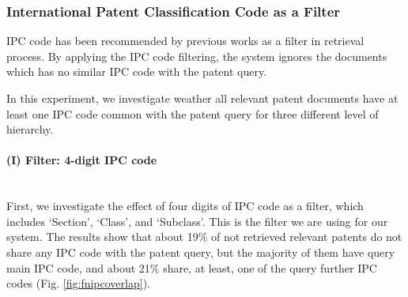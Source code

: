 \subsubsection{International Patent Classification Code as a Filter}
IPC code has been recommended by previous works as a filter in retrieval process. By applying the IPC code filtering, the system ignores the documents which has no similar IPC code with the patent query. 

In this experiment, we investigate weather all relevant patent documents have at least one IPC code common with the patent query for three different level of hierarchy. 
\paragraph{(I) Filter: 4-digit IPC code}
\ \\
First, we investigate the effect of four digits of IPC code as a filter, which includes `Section', `Class', and `Subclass'. 
This is the filter we are using for our system. 
The results show that about 19\% of not retrieved relevant patents do not share any IPC code with the patent query, but the majority of them have query main IPC code, and about 21\% share, at least, one of the query further IPC codes (Fig. \ref{fig:fnipcoverlap}). 

